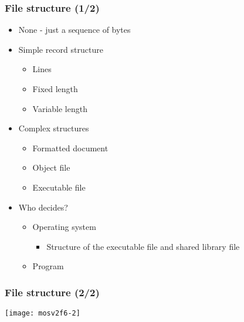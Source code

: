 \documentclass[CJKutf8,xcolor=pdftex,dvipsnames,table]{beamer}
\begin{document}
\begin{CJK*}{UTF8}{song}
  \begin{frame}
    \frametitle{File structure (1/2)} \pause
    \begin{itemize}\parskip=0pt
    \item None - just a sequence of bytes \pause
    \item Simple record structure \pause
      \begin{itemize}\parskip=0pt
      \item Lines \pause
      \item Fixed length \pause
      \item Variable length \pause
      \end{itemize}
    \item Complex structures
      \begin{itemize}\parskip=0pt
      \item Formatted document \pause
      \item Object file \pause
      \item Executable file \pause
      \end{itemize}
    \item Who decides? \pause
      \begin{itemize}\parskip=0pt
      \item Operating system \pause
        \begin{itemize}\parskip=0pt
        \item Structure of the executable file and shared library file \pause
        \end{itemize}
      \item Program
      \end{itemize}
    \end{itemize}
  \end{frame}

  \begin{frame}
    \frametitle{File structure (2/2)} \pause
    \begin{center}
      \texttt{[image: mosv2f6-2]}
    \end{center}
  \end{frame}


\end{CJK*}
\end{document}
